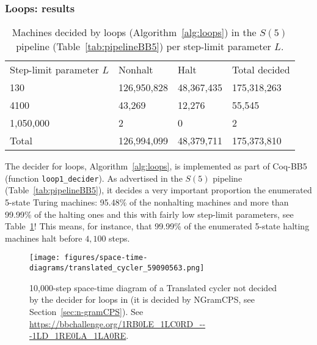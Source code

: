 \subsubsection{Loops: results}\label{sec:loops:results}

\begin{table}[h!]
  \centering
  \begin{tabular}{llll}
    Step-limit parameter $L$ & Nonhalt                         & Halt                           & Total decided \\
    130                      & 126,950,828                     & 48,367,435                     & 175,318,263   \\
    4100                     & 43,269                          & 12,276                         & 55,545        \\
    1,050,000                & 2                               & 0                              & 2             \\ \hline
    Total                    & \multicolumn{1}{r}{126,994,099} & \multicolumn{1}{r}{48,379,711} & 175,373,810
  \end{tabular}
  \caption{Machines decided by loops (Algorithm~\ref{alg:loops}) in the $S(5)$ pipeline (Table~\ref{tab:pipelineBB5}) per step-limit parameter $L$.}\label{tab:paramsLoops}
\end{table}

The decider for loops, Algorithm~\ref{alg:loops}, is implemented as part of Coq-BB5 (function \texttt{loop1\_decider}). As advertised in the $S(5)$ pipeline (Table~\ref{tab:pipelineBB5}), it decides a very important proportion the enumerated 5-state Turing machines: 95.48\% of the nonhalting machines and more than 99.99\% of the halting ones and this with fairly low step-limit parameters, see Table~\ref{tab:paramsLoops}! This means, for instance, that 99.99\% of the enumerated 5-state halting machines halt before $4,100$ steps.

\begin{figure}
  \centering
  \texttt{[image: figures/space-time-diagrams/translated\_cycler\_59090563.png]}

  \caption{10,000-step space-time diagram of a Translated cycler not decided by the decider for loops in \CoqBB (it is decided by NGramCPS, see Section~\ref{sec:n-gramCPS}). See \url{https://bbchallenge.org/1RB0LE_1LC0RD_---1LD_1RE0LA_1LA0RE}.}\label{fig:translated-cyclers-more}
\end{figure}


